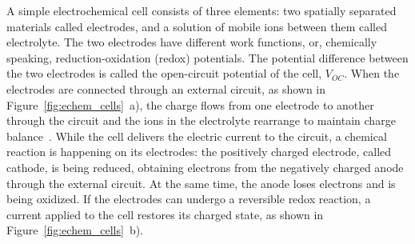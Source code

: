 A simple electrochemical cell consists of three elements: two spatially separated materials called electrodes, and a solution of mobile ions between them called electrolyte. The two electrodes have different work functions, or, chemically speaking, reduction-oxidation (redox) potentials. The potential difference between the two electrodes is called the open-circuit potential of the cell, $V_{OC}$. When the electrodes are connected through an external circuit, as shown in Figure~\ref{fig:echem_cells}~a), the charge flows from one electrode to another through the circuit and the ions in the electrolyte rearrange to maintain charge balance~\cite{muench2016_chemrev}. While the cell delivers the electric current to the circuit, a chemical reaction is happening on its electrodes: the positively charged electrode, called cathode, is being reduced, obtaining electrons from the negatively charged anode through the external circuit. At the same time, the anode loses electrons and is being oxidized. If the electrodes can undergo a reversible redox reaction, a current applied to the cell restores its charged state, as shown in Figure~\ref{fig:echem_cells}~b).\\

